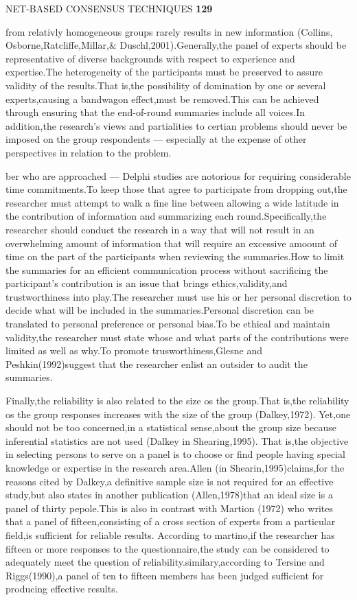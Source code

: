\documentclass[10pt,a4paper]{book}
\begin{document}
\begin{flushright}
  NET-BASED CONSENSUS TECHNIQUES \qquad \textbf{129}
\end{flushright}

from relativly homogeneous groups rarely results in new information (Collins, Osborne,Ratcliffe,Millar,$\&$ Duschl,2001).Generally,the panel of experts should be representative of diverse backgrounds with respect to experience and expertise.The heterogeneity of the participants must be preserved to assure validity of the results.That is,the possibility of domination by one or several experts,causing a bandwagon effect,must be removed.This can be achieved through ensuring that the end-of-round summaries include all voices.In addition,the research's views and partialities to certian problems should never be imposed on the group respondents --- especially at the expense of other perspectives in relation to the problem.

ber who are approached --- Delphi studies are notorious for requiring considerable time commitments.To keep those that agree to participate from dropping out,the researcher must attempt to walk a fine line between allowing a wide latitude in the contribution of information and summarizing each round.Specifically,the researcher should conduct the research in a way that will not result in an overwhelming amount of information that will require an excessive amoount of time on the part of the participants when reviewing the summaries.How to limit the summaries for an efficient communication process without sacrificing the participant's contribution is an issue that brings ethics,validity,and trustworthiness into play.The researcher must use his or her personal discretion to decide what will be included in the summaries.Personal discretion can be translated to personal preference or personal bias.To be ethical and maintain validity,the researcher must state whose and what parts of the contributions were limited as well as why.To promote trusworthiness,Glesne and Peshkin(1992)suggest that the researcher enlist an outsider to audit the summaries.

Finally,the reliability is also related to the size os the group.That is,the reliability os the group responses increases with the size of the group (Dalkey,1972). Yet,one should not be too concerned,in a statistical sense,about the group size because inferential statistics are not used (Dalkey in Shearing,1995). That is,the objective in selecting persons to serve on a panel is to choose or find people having special knowledge or expertise in the research area.Allen (in Shearin,1995)claims,for the reasons cited by Dalkey,a definitive sample size is not required for an effective study,but also states in another publication (Allen,1978)that an ideal size is a panel of thirty pepole.This is also in contrast with Martion (1972) who writes that a panel of fifteen,consisting of a cross section of experts from a particular field,is sufficient for reliable results. According to martino,if the researcher has fifteen or more responses to the questionnaire,the study can be considered to adequately meet the question of reliability.similary,according to Tersine and Riggs(1990),a panel of ten to fifteen members has been judged sufficient for producing effective results.
\end{document}
